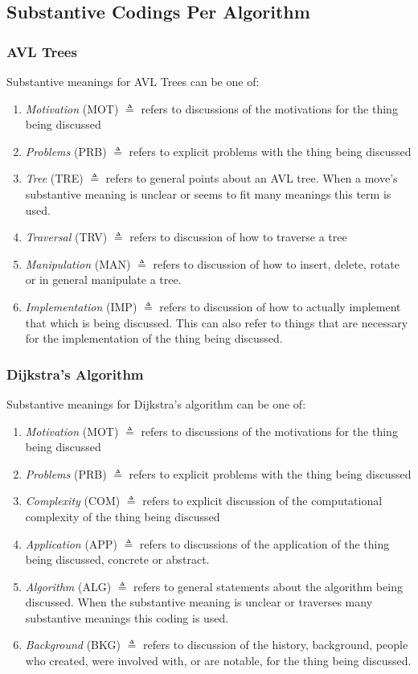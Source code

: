 \documentclass[10pt, letterpaper]{article}
\begin{document}
\begin{enumerate}
\end{enumerate}

\subsection*{Substantive Codings Per Algorithm}
\label{sec:orgb470dca}

\subsubsection*{AVL Trees}
\label{sec:orga32a336}
Substantive meanings for AVL Trees can be one of:
\begin{enumerate}
\item \emph{Motivation} (MOT) \(\triangleq\) refers to discussions of the motivations for the thing being discussed
\item \emph{Problems} (PRB) \(\triangleq\) refers to explicit problems with the thing being discussed
\item \emph{Tree} (TRE) \(\triangleq\) refers to general points about an AVL tree. When a move's substantive meaning is unclear or seems to fit many meanings this term is used.
\item \emph{Traversal} (TRV) \(\triangleq\) refers to discussion of how to traverse a tree
\item \emph{Manipulation} (MAN) \(\triangleq\) refers to discussion of how to insert, delete, rotate or in general manipulate a tree.
\item \emph{Implementation} (IMP) \(\triangleq\) refers to discussion of how to actually implement that which is being discussed. This can also refer to things that are necessary for the implementation of the thing being discussed.
\end{enumerate}
\subsubsection*{Dijkstra's Algorithm}
\label{sec:org4cb7c54}
Substantive meanings for Dijkstra's algorithm can be one of:
\begin{enumerate}
\item \emph{Motivation} (MOT) \(\triangleq\) refers to discussions of the motivations for the thing being discussed
\item \emph{Problems} (PRB) \(\triangleq\) refers to explicit problems with the thing being discussed
\item \emph{Complexity} (COM) \(\triangleq\) refers to explicit discussion of the computational complexity of the thing being discussed
\item \emph{Application} (APP) \(\triangleq\) refers to discussions of the application of the thing being discussed, concrete or abstract.
\item \emph{Algorithm} (ALG) \(\triangleq\) refers to general statements about the algorithm being discussed. When the substantive meaning is unclear or traverses many substantive meanings this coding is used.
\item \emph{Background} (BKG) \(\triangleq\) refers to discussion of the history, background, people who created, were involved with, or are notable, for the thing being discussed.
\end{enumerate}
\end{document}
